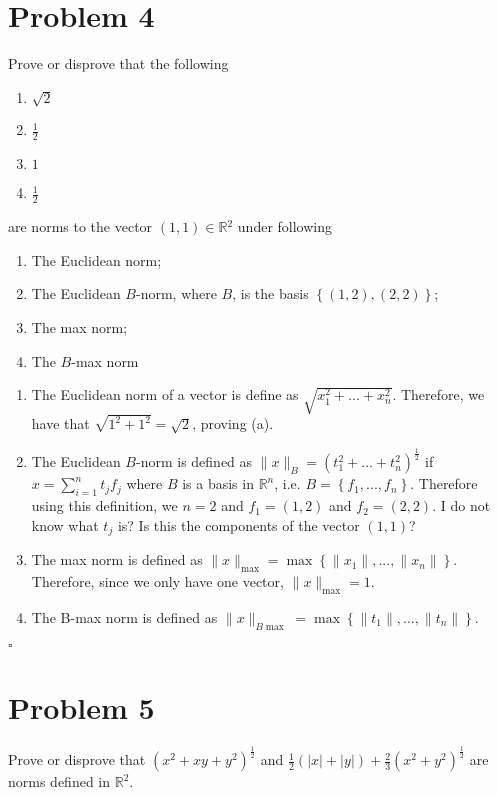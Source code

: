 \documentclass[11pt]{article}
\newcommand{\R}{\mathbb{R}}
\newcommand{\set}[1]{\left\{ #1\right\}}
\newenvironment{proof}{\noindent{\bf Proof.}}{\hfill $\square$\medskip}
\begin{document}
\section{Problem 4}
Prove or disprove that the following
\begin{enumerate}[label=(\alph*)]
    \item $\sqrt{2}$
    \item $\frac{1}{2}$
    \item $1$
    \item $\frac{1}{2}$
\end{enumerate}
are norms to the vector $(1,1)\in\R{^2}$ under following
\begin{enumerate}[label=(\alph*)]
    \item The Euclidean norm;
    \item The Euclidean $B$-norm, where $B$, is the basis $\set{(1,2),(2,2)}$;
    \item The max norm;
    \item The $B$-max norm
\end{enumerate}

\begin{proof}
    \begin{enumerate}[label=(\alph*)]
        \item The Euclidean norm of a vector is define as $\sqrt{x_{1}^{2}+...+x_{n}^{2}}$. Therefore,
        we have that $\sqrt{1^{2}+1^{2}}=\sqrt{2}$, proving (a).
        \item The Euclidean $B$-norm is defined as $\lVert x\rVert_{B}=(t_{1}^{2}+...+t_{n}^{2})^{\frac{1}{2}}$
        if $x=\sum_{i=1}^{n}t_{j}f_{j}$ where $B$ is a basis in $\R^{n}$, i.e. $B=\set{f_{1},...,f_{n}}$. Therefore
        using this definition, we $n=2$ and $f_{1}=(1,2)$ and $f_{2}=(2,2)$. I do not know what $t_{j}$ is?
        Is this the components of the vector $(1,1)$?
        \item The max norm is defined as $\lVert x\rVert_{\max}=\max\set{\lVert x_{1}\rVert,...,\lVert x_{n}\rVert}$.
        Therefore, since we only have one vector, $\lVert x\rVert_{\max}=1$.
        \item The B-max norm is defined as $\lVert x\rVert_{B\max}=\max\set{\lVert t_{1}\rVert,...,\lVert t_{n}\rVert}$.
    \end{enumerate}
\end{proof}

\section{Problem 5}
Prove or disprove that $(x^{2}+xy+y^{2})^{\frac{1}{2}}$ and
$\frac{1}{2}(\lvert x\rvert+\lvert y\rvert)+\frac{2}{3}(x^{2}+y^{2})^{\frac{1}{2}}$
are norms defined in $\R^{2}$.
\end{document}
